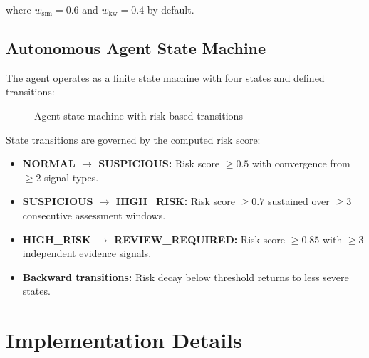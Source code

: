 \documentclass{article}
\begin{document}
where $w_{\text{sim}} = 0.6$ and $w_{\text{kw}} = 0.4$ by default.

\subsection{Autonomous Agent State Machine}

The agent operates as a finite state machine with four states and defined transitions:

\begin{figure}[H]
    \centering
    \caption{Agent state machine with risk-based transitions}
    \label{fig:state_machine}
\end{figure}

State transitions are governed by the computed risk score:
\begin{itemize}
    \item \textbf{NORMAL $\rightarrow$ SUSPICIOUS:} Risk score $\geq 0.5$ with convergence from $\geq 2$ signal types.
    \item \textbf{SUSPICIOUS $\rightarrow$ HIGH\_RISK:} Risk score $\geq 0.7$ sustained over $\geq 3$ consecutive assessment windows.
    \item \textbf{HIGH\_RISK $\rightarrow$ REVIEW\_REQUIRED:} Risk score $\geq 0.85$ with $\geq 3$ independent evidence signals.
    \item \textbf{Backward transitions:} Risk decay below threshold returns to less severe states.
\end{itemize}

\section{Implementation Details}
\label{sec:implementation}
\end{document}
